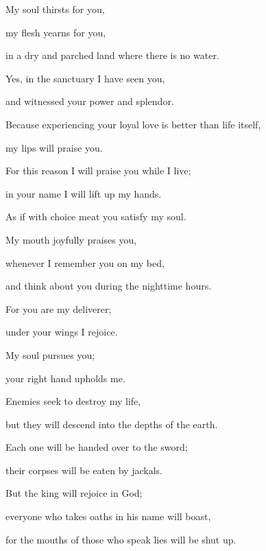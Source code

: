 {\par }{\Q My soul
thirsts
for you,
\par }{\Q my flesh
yearns
for you,
\par }{\Q in a dry
and parched
land
where there is no
water.
\par }{\Q {}Yes,
in the sanctuary
I have
seen
you,

\par }{\Q and witnessed
your power
and splendor.
\par }{\Q {}Because
experiencing
your loyal love
is better than
life
itself,
\par }{\Q my lips
will praise you.
\par }{\Q {}For this reason
I will praise
you while I live;
\par }{\Q in your name
I will lift
up my hands.
\par }{\Q {}As
if with choice meat
you satisfy
my soul.
\par }{\Q My mouth
joyfully
praises you,
\par }{\Q {}whenever
I remember
you on
my bed,
\par }{\Q and think about
you during the nighttime
hours.
\par }{\Q {}For
you are
my deliverer;
\par }{\Q under your wings
I rejoice.
\par }{\Q {}My soul
pursues
you;

\par }{\Q your right hand
upholds me.
\par }{\Q {}Enemies seek
to destroy
my life,
\par }{\Q but they
will descend
into the depths
of the earth.
\par }{\Q {}Each
one will be handed
over to the sword;
\par }{\Q their corpses
will be eaten by jackals.
\par }{\Q {}But the king
will rejoice
in God;
\par }{\Q everyone
who takes oaths
in his name will boast,
\par }{\Q for
the mouths
of those who speak
lies will be shut up.


}
